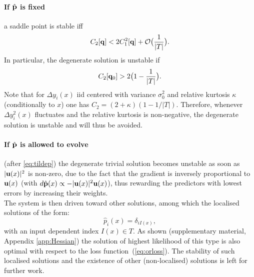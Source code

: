 \paragraph{If $\hat {\bf p}$ is fixed} a saddle point is stable iff
\[
C_2[{\bf q}] < 2C_1^2[{\bf q}]+{\cal O}\bigl(\frac{1}{\vert T\vert}\bigr).
\]
In particular, the degenerate solution is unstable if
\[
C_2[{\bf q}_0] > 2\bigl(1-\frac{1}{\vert T\vert}\bigr).
\]
Note that for $\Delta y_i(x)$ iid centered with variance $\sigma_0^2$ and relative kurtosis $\kappa$ (conditionally to $x$)
one has $C_2 = (2+\kappa)(1-1/\vert T\vert)$. Therefore, whenever $\Delta y_i^2(x)$ fluctuates and the relative kurtosis is non-negative, %
the  degenerate solution is unstable and will thus be avoided.

\paragraph{If $\hat {\bf p}$ is allowed to evolve} (after \cref{eq:tildep}) the degenerate trivial solution 
becomes unstable as soon as $\vert {\bf u}(x)\vert^2$ is non-zero, due to the fact that the gradient is 
inversely proportional to ${\bf u}(x)$ (with $d\hat{\bf p}(x)\propto -\vert {\bf u}(x)\vert^2 {\bf u}(x)$), thus 
rewarding the predictors with lowest errors by increasing their weights. \\

The system is then driven toward other solutions, among which the localised solutions of the form: 
\[
\hat p_i(x) = \delta_{iI(x)},
\]
with an input dependent index $I(x)\in T$. As shown (supplementary material, Appendix \ref{app:Hessian}) the solution of highest likelihood of this type is also optimal with respect to the loss function~(\cref{eq:orloss}). The stability of such localised solutions and the existence of other (non-localised) solutions is left for further work.  



